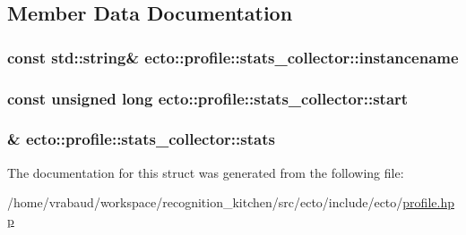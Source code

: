 \subsection{Member Data Documentation}
\hypertarget{structecto_1_1profile_1_1stats__collector_ac3d5d7adf91b02719a6b897869683f03}{
\subsubsection[{instancename}]{\setlength{\rightskip}{0pt plus 5cm}const std\-::string\& ecto\-::profile\-::stats\-\_\-collector\-::instancename}}\label{structecto_1_1profile_1_1stats__collector_ac3d5d7adf91b02719a6b897869683f03}
\hypertarget{structecto_1_1profile_1_1stats__collector_ae607313a8ecc75d6a6ab201cdf7c2d61}{
\subsubsection[{start}]{\setlength{\rightskip}{0pt plus 5cm}const unsigned long ecto\-::profile\-::stats\-\_\-collector\-::start}}\label{structecto_1_1profile_1_1stats__collector_ae607313a8ecc75d6a6ab201cdf7c2d61}
\hypertarget{structecto_1_1profile_1_1stats__collector_a2c206fb60ea04b5162ec43a609f2a185}{
\subsubsection[{stats}]{\& ecto\-::profile\-::stats\-\_\-collector\-::stats}}\label{structecto_1_1profile_1_1stats__collector_a2c206fb60ea04b5162ec43a609f2a185}


The documentation for this struct was generated from the following file\-:\begin{DoxyCompactItemize}
\item 
/home/vrabaud/workspace/recognition\-\_\-kitchen/src/ecto/include/ecto/\hyperlink{profile_8hpp}{profile.\-hpp}\end{DoxyCompactItemize}
